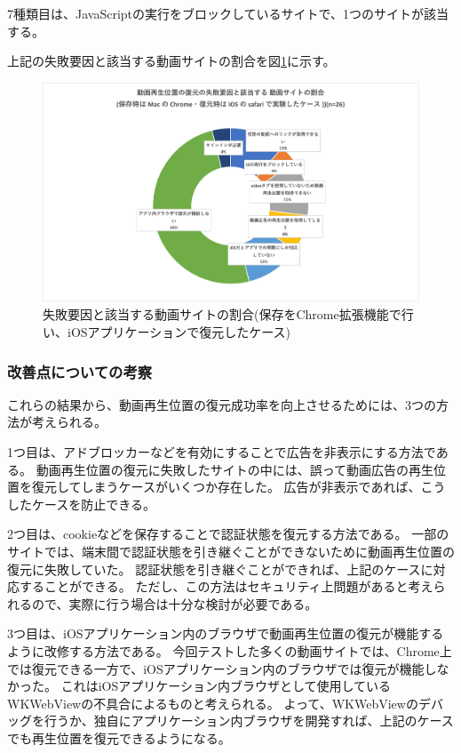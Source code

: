 7種類目は、JavaScriptの実行をブロックしているサイトで、1つのサイトが該当する。

上記の失敗要因と該当する動画サイトの割合を図\ref{fig:evl-consideration-video-cause-ratio-chrome-ios}に示す。

\begin{figure}[htbp]
  \label{fig:evl-consideration-video-cause-ratio-chrome-ios}
  \begin{center}
    \includegraphics[bb=0 0 780 454.22222222,width=15cm]{img/060_evaluation/consideration/video/cause-ratio-chrome-ios.pdf}
  \end{center}
  \caption{失敗要因と該当する動画サイトの割合(保存をChrome拡張機能で行い、iOSアプリケーションで復元したケース)}
\end{figure}

\subsubsection{改善点についての考察}
これらの結果から、動画再生位置の復元成功率を向上させるためには、3つの方法が考えられる。

1つ目は、アドブロッカーなどを有効にすることで広告を非表示にする方法である。
動画再生位置の復元に失敗したサイトの中には、誤って動画広告の再生位置を復元してしまうケースがいくつか存在した。
広告が非表示であれば、こうしたケースを防止できる。

2つ目は、cookieなどを保存することで認証状態を復元する方法である。
一部のサイトでは、端末間で認証状態を引き継ぐことができないために動画再生位置の復元に失敗していた。
認証状態を引き継ぐことができれば、上記のケースに対応することができる。
ただし、この方法はセキュリティ上問題があると考えられるので、実際に行う場合は十分な検討が必要である。

3つ目は、iOSアプリケーション内のブラウザで動画再生位置の復元が機能するように改修する方法である。
今回テストした多くの動画サイトでは、Chrome上では復元できる一方で、iOSアプリケーション内のブラウザでは復元が機能しなかった。
これはiOSアプリケーション内ブラウザとして使用しているWKWebViewの不具合によるものと考えられる。
よって、WKWebViewのデバッグを行うか、独自にアプリケーション内ブラウザを開発すれば、上記のケースでも再生位置を復元できるようになる。
